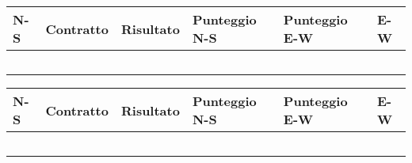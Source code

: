 \documentclass[a4paper,italian,12pt]{article}
\begin{document}

\begin{tcolorbox}
\begin{minipage}{.3\textwidth}
\newgame
{}

\hspace{-.2cm}\showAll
\end{minipage}
\begin{minipage}{.7\textwidth}

\renewcommand{\arraystretch}{2}
\begin{tabular}{|l|l|l|l|l|l|}
\hline
N-S & Contratto\hspace{1.5cm} & Risultato& Punteggio N-S & Punteggio E-W & E-W\\\hline
  &&&&&\\\hline
   &&&&&\\\hline
    &&&&&\\\hline
     &&&&&\\\hline
          &&&&&\\\hline
\end{tabular}
\end{minipage}
\end{tcolorbox}

\medskip

\begin{tcolorbox}
\begin{minipage}{.3\textwidth}
\newgame
{}

\hspace{-.2cm}\showAll
\end{minipage}
\begin{minipage}{.7\textwidth}

\renewcommand{\arraystretch}{2}
\begin{tabular}{|l|l|l|l|l|l|}
\hline
N-S & Contratto\hspace{1.5cm} & Risultato& Punteggio N-S & Punteggio E-W & E-W\\\hline
  &&&&&\\\hline
   &&&&&\\\hline
    &&&&&\\\hline
     &&&&&\\\hline
          &&&&&\\\hline
\end{tabular}
\end{minipage}
\end{tcolorbox}
\end{document}
